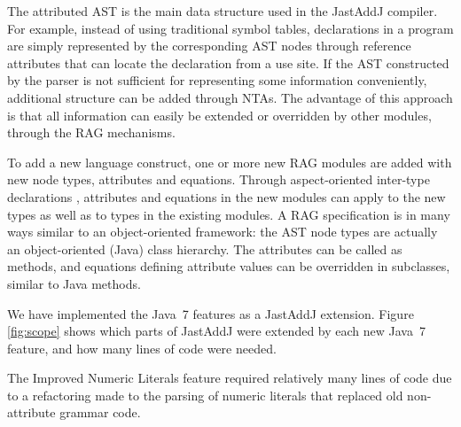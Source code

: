 {The attributed AST is the main data structure used in the Jast\-AddJ compiler.
For example, instead of using traditional symbol tables, declarations in a
program are simply represented by the corresponding AST nodes through reference
attributes that can locate the declaration from a use site. If the AST
constructed by the parser is not sufficient for representing some information
conveniently, additional structure can be added through NTAs. The advantage of
this approach is that all information can easily be extended or overridden by
other modules, through the RAG mechanisms.


To add a new language construct, one or more new RAG modules are added with new
node types, attributes and equations. Through aspect-oriented inter-type
declarations \cite{1997aspect}, attributes and equations in the new modules can
apply to the new types as well as to types in the existing modules.  A RAG
specification is in many ways similar to an object-oriented framework: the AST
node types are actually an object-oriented (Java) class hierarchy. The
attributes can be called as methods, and equations defining attribute values
can be overridden in subclasses, similar to Java methods.

We have implemented the Java~7 features as a JastAddJ extension. Figure
\ref{fig:scope} shows which parts of JastAddJ were extended by each new Java~7
feature, and how many lines of code were needed.

The Improved Numeric Literals feature required relatively many lines of code
due to a refactoring made to the parsing of numeric literals that replaced old
non-attribute grammar code.

\begin{figure}
\end{figure}}
